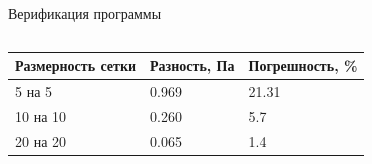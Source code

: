 \documentclass[ignoreonframetext,unicode]{beamer}
\begin{document}
\begin{frame}{Верификация программы}
\begin{columns}
	\end{columns}
	\vspace*{-4mm}
\begin{table}[!htbp]
	\begin{tabular}{|l|l|l|}
		\hline
		\multicolumn{1}{|c|}{Размерность сетки} & \multicolumn{1}{c|}{Разность, Па} & Погрешность, \% \\ \hline
		5 на 5                                  & 0.969                              & 21.31            \\ \hline
		10 на 10                                & 0.260                              & 5.7            \\ \hline
		20 на 20                                & 0.065                              & 1.4            \\ \hline
	\end{tabular}
\end{table}
\end{frame}
\end{document}
